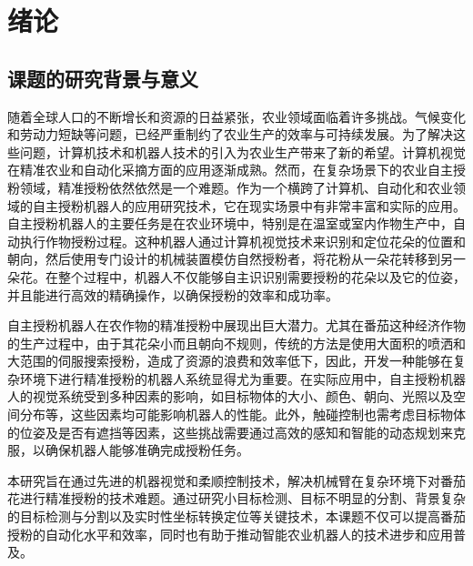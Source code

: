     
\chapter{绪论}\label{ch:1}
\section{课题的研究背景与意义}
随着全球人口的不断增长和资源的日益紧张，农业领域面临着许多挑战。气候变化和劳动力短缺等问题，已经严重制约了农业生产的效率与可持续发展。为了解决这些问题，计算机技术和机器人技术的引入为农业生产带来了新的希望。计算机视觉在精准农业和自动化采摘方面的应用逐渐成熟。然而，在复杂场景下的农业自主授粉领域，精准授粉依然依然是一个难题。作为一个横跨了计算机、自动化和农业领域的自主授粉机器人的应用研究技术，它在现实场景中有非常丰富和实际的应用。自主授粉机器人的主要任务是在农业环境中，特别是在温室或室内作物生产中，自动执行作物授粉过程。这种机器人通过计算机视觉技术来识别和定位花朵的位置和朝向，然后使用专门设计的机械装置模仿自然授粉者，将花粉从一朵花转移到另一朵花。在整个过程中，机器人不仅能够自主识识别需要授粉的花朵以及它的位姿，并且能进行高效的精确操作，以确保授粉的效率和成功率。

自主授粉机器人在农作物的精准授粉中展现出巨大潜力。尤其在番茄这种经济作物的生产过程中，由于其花朵小而且朝向不规则，传统的方法是使用大面积的喷洒和大范围的伺服搜索授粉，造成了资源的浪费和效率低下，因此，开发一种能够在复杂环境下进行精准授粉的机器人系统显得尤为重要。在实际应用中，自主授粉机器人的视觉系统受到多种因素的影响，如目标物体的大小、颜色、朝向、光照以及空间分布等，这些因素均可能影响机器人的性能。此外，触碰控制也需考虑目标物体的位姿及是否有遮挡等因素，这些挑战需要通过高效的感知和智能的动态规划来克服，以确保机器人能够准确完成授粉任务。

本研究旨在通过先进的机器视觉和柔顺控制技术，解决机械臂在复杂环境下对番茄花进行精准授粉的技术难题。通过研究小目标检测、目标不明显的分割、背景复杂的目标检测与分割以及实时性坐标转换定位等关键技术，本课题不仅可以提高番茄授粉的自动化水平和效率，同时也有助于推动智能农业机器人的技术进步和应用普及。



